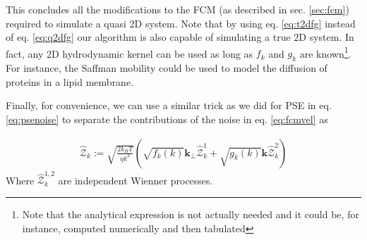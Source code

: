 \documentclass[ twoside,openright,titlepage,numbers=noenddot,%
headinclude,footinclude,cleardoublepage=empty,abstract=on,
BCOR=5mm,paper=a4,fontsize=11pt, dvipsnames
]{scrreprt}
\renewcommand{\vec}[1]{\bm{#1}}
\newcommand{\tens}[1]{\bm{\mathcal{#1}}}
\newcommand{\kT}{k_B T}
\newcommand{\half}{\frac{1}{2}}
\newcommand{\fou}[1]{\widehat{#1}}
\begin{document}
This concludes all the modifications to the \gls{FCM} (as described in sec. \ref{sec:fcm}) required to simulate a quasi 2D system. Note that by using eq. \eqref{eq:t2dfg} instead of eq. \eqref{eq:q2dfg} our algorithm is also capable of simulating a true 2D system. In fact, any 2D hydrodynamic kernel can be used as long as $f_k$ and $g_k$ are known\footnote{Note that the analytical expression is not actually needed and it could be, for instance, computed numerically and then tabulated}. For instance, the Saffman mobility could be used to model the diffusion of proteins in a lipid membrane\cite{Saffman}.

Finally, for convenience, we can use a similar trick as we did for \gls{PSE} in eq. \eqref{eq:psenoise} to separate the contributions of the noise in eq. \eqref{eq:fcmvel} as

\begin{equation}
  \begin{aligned}
    \fou{\tens{Z}}_k := \sqrt{\frac{2\kT}{\eta k^3}}\left(\sqrt{f_k(k)}\vec{k}_\perp\fou{\tens{Z}}^1_k + \sqrt{g_k(k)}\vec{k}\fou{\tens{Z}}^2_k\right)
  \end{aligned}
\end{equation}
Where $\fou{\tens{Z}}^{1,2}_k$ are independent Wienner processes.
\end{document}
